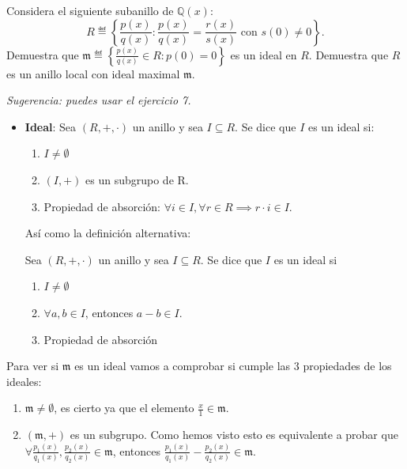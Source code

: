 \begin{problem}
Considera el siguiente subanillo de ${\mathbb Q}(x)$:
$$R ≝\left\{\frac{p(x)}{q(x)}: \frac{p(x)}{q(x)} =\frac{r(x)}{s(x)} \text{ con }  s(0)\neq 0\right\}. $$
\ppart  Demuestra que  ${\mathfrak m} ≝ \left\{\frac{p(x)}{q(x)}\in R: p(0)=0\right\}$ es un ideal en $R$.
\ppart  Demuestra que $R$ es un anillo local con ideal maximal $\mathfrak m$.

{\em Sugerencia: puedes usar el ejercicio 7.}

\solution


\spart
\begin{defToUse}
	\begin{itemize}
		\item \textbf{Ideal}: Sea $(R,+,\cdot)$ un anillo y sea $I \subseteq R$. Se dice que $I$ es un ideal si:
		\begin{enumerate}
			\item $I \neq \emptyset$
			\item $(I, +)$ es un subgrupo de R.
			\item Propiedad de absorción: $\forall i \in I, \forall r \in R \implies r\cdot i \in I$.
		\end{enumerate}

		Así como la definición alternativa:

		Sea $(R,+,\cdot)$ un anillo y sea $I \subseteq R$. Se dice que $I$ es un ideal si
		\begin{enumerate}
			\item $I \neq \emptyset$
			\item $\forall a,b \in I$, entonces $a-b \in I$.
			\item Propiedad de absorción
		\end{enumerate}
	\end{itemize}
\end{defToUse}

Para ver si $\mathfrak{m}$ es un ideal vamos a comprobar si cumple las 3 propiedades de los ideales:

\begin{enumerate}
	\item $\mathfrak{m} \neq \emptyset$, es cierto ya que el elemento $\frac{x}{1} \in \mathfrak{m}$.
	\item $(\mathfrak{m},+)$ es un subgrupo. Como hemos visto esto es equivalente a probar que $\forall \frac{p_1(x)}{q_1(x)}, \frac{p_2(x)}{q_2(x)} \in \mathfrak{m}$, entonces $\frac{p_1(x)}{q_1(x)}- \frac{p_2(x)}{q_2(x)} \in \mathfrak{m}$.


\end{enumerate}
\end{problem}
